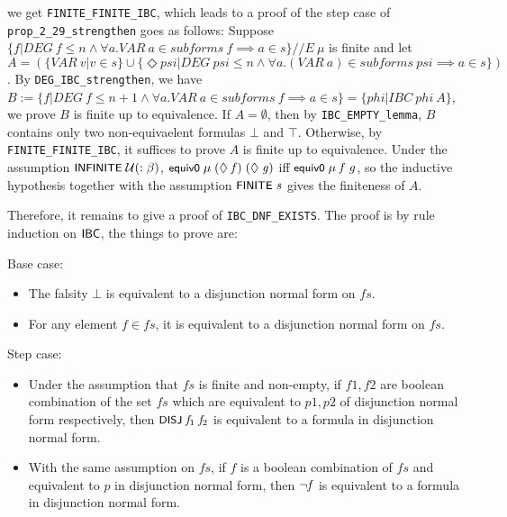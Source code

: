 \documentclass[letterpaper]{article}
\renewcommand{\HOLConst}[1]{{\textsf{\upshape\small #1}}}
\renewcommand{\HOLinline}[1]{\ensuremath{#1}}
\begin{document}
we get \texttt{FINITE_FINITE_IBC}, which leads to a proof of the step case of \texttt{prop_2_29_strengthen} goes as follows: 
Suppose $\{f | DEG\ f \le n \land \forall a. VAR \ a \in subforms\ f \implies a \in s\}//E \ \mu$ is finite and let $A = (\{VAR\ v | v \in s\} \cup \{\Diamond psi | DEG \ psi \le n \land \forall a. (VAR\ a) \in subforms\ psi \implies a \in s\})$. By \texttt{DEG_IBC_strengthen}, we have $B:=\{f | DEG\ f \le n+1 \land \forall a. VAR \ a \in subforms\ f \implies a \in s\}=\{phi | IBC\ phi \ A\}$, we prove $B$ is finite up to equivalence. If $A=\emptyset$, then by \texttt{IBC_EMPTY_lemma}, $B$ contains only two non-equivaelent formulas $\bot$ and $\top$. Otherwise, by \texttt{FINITE_FINITE_IBC}, it suffices to prove $A$ is finite up to equivalence. Under the assumption \HOLinline{\HOLConst{INFINITE}\;\ensuremath{\cal{U}}(:\ensuremath{\beta})}, \HOLinline{\HOLConst{equiv0}\;\HOLFreeVar{\ensuremath{\mu}}\;(\HOLSymConst{\ensuremath{\Diamond}}\;\HOLFreeVar{f})\;(\HOLSymConst{\ensuremath{\Diamond}}\;\HOLFreeVar{g})} iff \HOLinline{\HOLConst{equiv0}\;\HOLFreeVar{\ensuremath{\mu}}\;\HOLFreeVar{f}\;\HOLFreeVar{g}}, so the inductive hypothesis together  with the assumption \HOLinline{\HOLConst{FINITE}\;\HOLFreeVar{s}} gives the finiteness of $A$.

Therefore, it remains to give a proof of \texttt{IBC_DNF_EXISTS}. The proof is by rule induction on \HOLinline{\HOLConst{IBC}}, the things to prove are:

Base case:
\begin{itemize}
  \item The falsity $\bot$ is equivalent to a disjunction normal form on $fs$.
  \item For any element $f\in fs$, it is equivalent to a disjunction normal form on $fs$.
\end{itemize}

Step case:

\begin{itemize}
  \item Under the assumption that $fs$ is finite and non-empty, if $f1,f2$ are boolean combination of the set $fs$ which are equivalent to $p1,p2$ of disjunction normal form respectively, then \HOLinline{\HOLConst{DISJ}\;\HOLFreeVar{f\sb{\mathrm{1}}}\;\HOLFreeVar{f\sb{\mathrm{2}}}} is equivalent to a formula in disjunction normal form.
  \item With the same assumption on $fs$, if $f$ is a boolean combination of $fs$ and equivalent to $p$ in disjunction normal form, then \HOLinline{\HOLSymConst{\HOLTokenNeg{}}\HOLFreeVar{f}} is equivalent to a formula in disjunction normal form.
\end{itemize}
\end{document}
